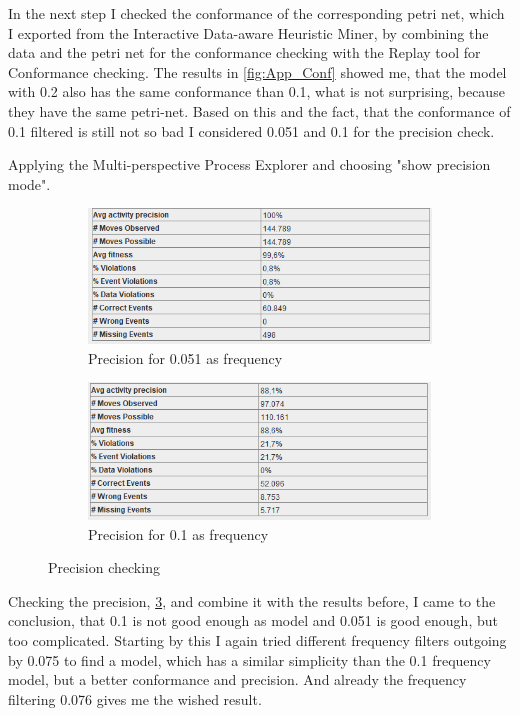 In the next step I checked the conformance of the corresponding petri net, which I exported from the Interactive Data-aware Heuristic Miner, by combining the data and the petri net for the conformance checking with the Replay tool for Conformance checking. 
The results in \ref{fig:App_Conf} showed me, that the model with 0.2 also has the same conformance than 0.1, what is not surprising, because they have the same petri-net. Based on this and the fact, that the conformance of 0.1 filtered is still not so bad I considered 0.051 and 0.1 for the precision check.

Applying the Multi-perspective Process Explorer and choosing "show precision mode".

\begin{figure}[!htbp]
\centering
\begin{subfigure}{.4\textwidth}
  \centering
  \includegraphics[width=\linewidth]{App_Precision0-051.PNG}
  \caption{Precision for 0.051 as frequency}
  \label{fig:APP_Prec0-051}
\end{subfigure}%
\begin{subfigure}{.4\textwidth}
  \centering
  \includegraphics[width=\linewidth]{App_Precision0-1.PNG}
  \caption{Precision for 0.1 as frequency}
  \label{fig:APP_Prec0-1}
\end{subfigure}
\caption{Precision checking}
\label{fig:App_Prec}
\end{figure}

Checking the precision, \ref{fig:App_Prec}, and combine it with the results before, I came to the conclusion, that 0.1 is not good enough as model and 0.051 is good enough, but too complicated. Starting by this I again tried different frequency filters outgoing by 0.075 to find a model, which has a similar simplicity than the 0.1 frequency model, but a better conformance and precision. And already the frequency filtering 0.076 gives me the wished result.

